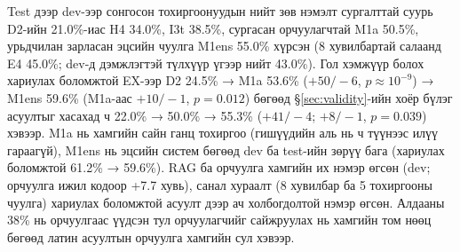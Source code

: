 Test дээр dev-ээр сонгосон тохиргоонуудын нийт зөв нэмэлт сургалттай суурь D2-ийн 21.0\%-иас H4 34.0\%, I3t 38.5\%,
сургасан орчуулагчтай M1a 50.5\%, урьдчилан зарласан эцсийн чуулга M1ens 55.0\% хүрсэн (8 хувилбартай салаанд E4 45.0\%;
dev-д дэмжлэгтэй түлхүүр үгээр нийт 43.0\%). Гол хэмжүүр болох хариулах боломжтой EX-ээр D2 24.5\% → M1a 53.6\%
($+50/-6$, $p \approx 10^{-9}$) → M1ens 59.6\% (M1a-аас $+10/-1$, $p = 0.012$) бөгөөд §\ref{sec:validity}-ийн хоёр бүлэг
асуултыг хасахад ч 22.0\% → 50.0\% → 55.3\% ($+41/-4$; $+8/-1$, $p = 0.039$) хэвээр. M1a нь хамгийн сайн ганц тохиргоо
(гишүүдийн аль нь ч түүнээс илүү гараагүй), M1ens нь эцсийн систем бөгөөд dev ба test-ийн зөрүү бага (хариулах боломжтой
61.2\% → 59.6\%). RAG ба орчуулга хамгийн их нэмэр өгсөн (dev; орчуулга ижил кодоор +7.7 хувь), санал хураалт (8 хувилбар
ба 5 тохиргооны чуулга) хариулах боломжтой асуулт дээр ач холбогдолтой нэмэр өгсөн. Алдааны 38\% нь орчуулгаас үүдсэн тул орчуулагчийг
сайжруулах нь хамгийн том нөөц бөгөөд латин асуултын орчуулга хамгийн сул хэвээр.
